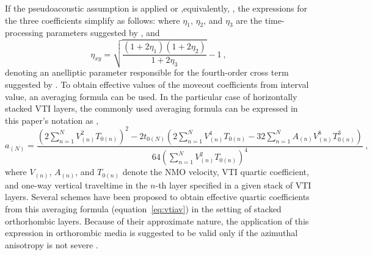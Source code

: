If the pseudoacoustic assumption \cite[]{alkaortho} is applied or ,equivalently,  , the expressions for the three coefficients simplify as follows:
where $\eta_1$, $\eta_2$, and $\eta_3$ are the time-processing parameters suggested by \cite{alkaortho}, and
\begin{equation}
\eta_{xy} = \sqrt{\frac{(1+2\eta_1)(1+2\eta_2)}{1+2\eta_3}}-1~,
\end{equation}
denoting an anelliptic parameter responsible for the fourth-order cross term suggested by \cite{stovasortho}.
To obtain effective values of the moveout coefficients from interval value, an averaging formula can be used. In the particular case of horizontally stacked VTI layers, the commonly used averaging formula can be expressed in this paper's notation as \cite[]{hake,tsvankinthomsen1994},
\begin{equation}
\label{eq:vtiav}
a_{(N)} = \frac{(2\sum\limits^N_{n=1} V^2_{(n)} T_{0(n)})^2 - 2t_{0(N)} (2\sum\limits^N_{n=1} V^4_{(n)} T_{0(n)} - 32 \sum\limits^N_{n=1} A_{(n)} V^8_{(n)} T^3_{0(n)})}{64(\sum\limits^N_{n=1} V^2_{(n)} T_{0(n)})^4}~,
\end{equation}
where $V_{(n)}$, $A_{(n)}$, and $T_{0(n)}$ denote the  NMO velocity, VTI quartic coefficient, and one-way vertical traveltime in the $n$-th layer specified in a given stack of VTI layers. Several schemes have been proposed to obtain  effective quartic coefficients from this averaging formula (equation~\ref{eq:vtiav}) in the setting of stacked orthorhombic layers. Because of their approximate nature, the application of this expression in orthorombic media is suggested to be valid only if the azimuthal anisotropy is not severe \cite[]{alortho,vascon}.

